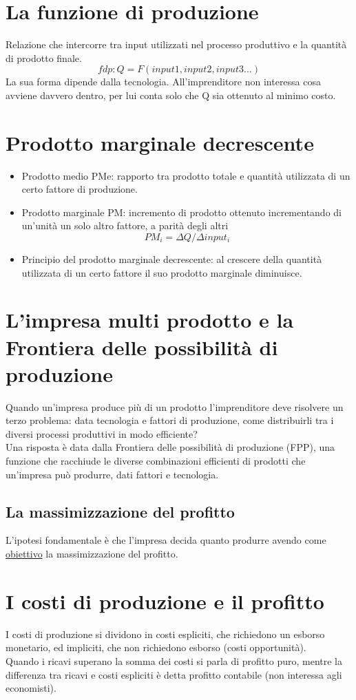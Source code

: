 \documentclass{report}
\begin{document}
	\section{La funzione di produzione}
	Relazione che intercorre tra input utilizzati nel processo produttivo e la quantità di prodotto finale.
	\[ fdp: Q = F(input1, input2, input3 ...) \]
	La sua forma dipende dalla tecnologia. All'imprenditore non interessa cosa avviene davvero dentro, per lui conta solo che Q sia ottenuto al minimo costo.
	\section{Prodotto marginale decrescente}
	\begin{itemize}
		\item Prodotto medio PMe: rapporto tra prodotto totale e quantità utilizzata di un certo fattore di produzione.
		\item Prodotto marginale PM: incremento di prodotto ottenuto incrementando di un'unità un solo altro fattore, a parità degli altri\[ PM_{i} = \Delta Q / \Delta input_{i} \]
		\item Principio del prodotto marginale decrescente: al crescere della quantità utilizzata di un certo fattore il suo prodotto marginale diminuisce.
	\end{itemize}
	\section{L'impresa multi prodotto e la Frontiera delle possibilità di produzione}
	Quando un'impresa produce più di un prodotto l'imprenditore deve risolvere un terzo problema: data tecnologia e fattori di produzione, come distribuirli tra i diversi processi produttivi in modo efficiente?
	\medskip \\
	Una risposta è data dalla Frontiera delle possibilità di produzione (FPP), una funzione che racchiude le diverse combinazioni efficienti di prodotti che un'impresa può produrre, dati fattori e tecnologia.
	\subsection{La massimizzazione del profitto}
	L'ipotesi fondamentale è che l'impresa decida quanto produrre avendo come \underline{obiettivo} la massimizzazione del profitto.
	\section{I costi di produzione e il profitto}
	I costi di produzione si dividono in costi espliciti, che richiedono un esborso monetario, ed impliciti, che non richiedono esborso (costi opportunità).
	\medskip \\
	Quando i ricavi superano la somma dei costi si parla di profitto puro, mentre la differenza tra ricavi e costi espliciti è detta profitto contabile (non interessa agli economisti).
\end{document}
